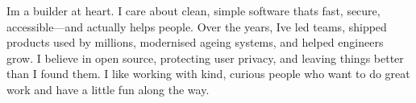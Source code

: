 \documentclass[]{resume-format}
\begin{document}
%


\setlength\fboxsep{10pt}%

\begingroup

\noindent
{}
\endgroup
\vspace{0mm} %



\begin{cvpersonalstatement}
  \item { I\textquotesingle{}m a builder at heart. I care about clean, simple software that\textquotesingle{}s fast,
secure, accessible—and actually helps people.
Over the years, I\textquotesingle{}ve led teams, shipped products used by millions,
modernised ageing systems, and helped engineers grow.
I believe in open source, protecting user privacy, and leaving things better
than I found them.
I like working with kind, curious people who want to do great work and have a
little fun along the way.
 }
\end{cvpersonalstatement}


\end{document}
